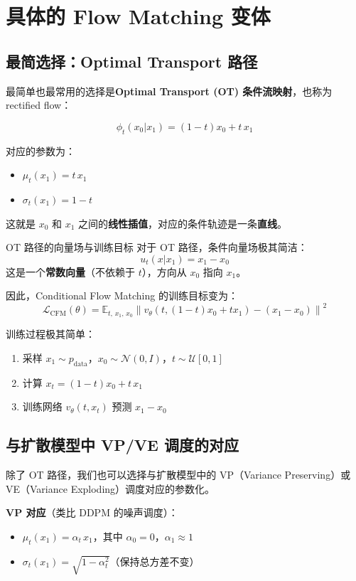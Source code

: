 \section{具体的 Flow Matching 变体}

\subsection{最简选择：Optimal Transport 路径}

最简单也最常用的选择是\textbf{Optimal Transport (OT) 条件流映射}，也称为 rectified flow：

$$\phi_t(x_0 | x_1) = (1 - t) x_0 + t \, x_1$$

对应的参数为：
\begin{itemize}
    \item $\mu_t(x_1) = t \, x_1$
    \item $\sigma_t(x_1) = 1 - t$
\end{itemize}

这就是 $x_0$ 和 $x_1$ 之间的\textbf{线性插值}，对应的条件轨迹是一条\textbf{直线}。

\begin{importantbox}{OT 路径的向量场与训练目标}
对于 OT 路径，条件向量场极其简洁：
$$u_t(x | x_1) = x_1 - x_0$$
这是一个\textbf{常数向量}（不依赖于 $t$），方向从 $x_0$ 指向 $x_1$。

因此，Conditional Flow Matching 的训练目标变为：
$$\mathcal{L}_{\text{CFM}}(\theta) = \mathbb{E}_{t, \, x_1, \, x_0} \left\| v_\theta(t, (1-t)x_0 + t x_1) - (x_1 - x_0) \right\|^2$$

训练过程极其简单：
\begin{enumerate}
    \item 采样 $x_1 \sim p_{\text{data}}$，$x_0 \sim \mathcal{N}(0, I)$，$t \sim \mathcal{U}[0,1]$
    \item 计算 $x_t = (1-t)x_0 + t \, x_1$
    \item 训练网络 $v_\theta(t, x_t)$ 预测 $x_1 - x_0$
\end{enumerate}
\end{importantbox}

\subsection{与扩散模型中 VP/VE 调度的对应}

除了 OT 路径，我们也可以选择与扩散模型中的 VP（Variance Preserving）或 VE（Variance Exploding）调度对应的参数化。

\textbf{VP 对应}（类比 DDPM 的噪声调度）：
\begin{itemize}
    \item $\mu_t(x_1) = \alpha_t \, x_1$，其中 $\alpha_0 = 0$，$\alpha_1 \approx 1$
    \item $\sigma_t(x_1) = \sqrt{1 - \alpha_t^2}$（保持总方差不变）
\end{itemize}

